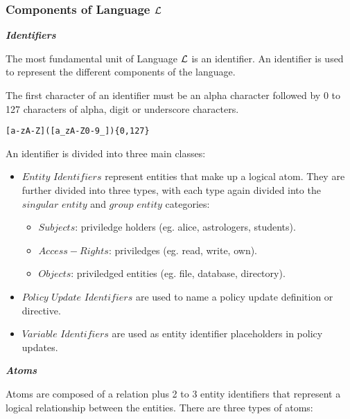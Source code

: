 \documentclass[10pt, twocolumn]{article}
\begin{document}
      \subsubsection{Components of Language $\cal{L}$}

        \noindent \textbf{\emph{Identifiers}}

          The most fundamental unit of Language $\cal{L}$ is an identifier. An
          identifier is used to represent the different components of the
          language. 
    
          The first character of an identifier must be an alpha character
          followed by 0 to 127 characters of alpha, digit or underscore
          characters.

          \begin{verbatim}[a-zA-Z]([a_zA-Z0-9_]){0,127}\end{verbatim}

          An identifier is divided into three main classes:

          \begin{itemize}
            \item
              $Entity$ $Identifiers$ represent entities that make up a logical
              atom. They are further divided into three types, with each type
              again divided into the $singular$ $entity$ and $group$ $entity$
              categories:
              \begin{itemize}
                \item
                  $Subjects$: priviledge holders (eg. alice, astrologers,
                  students).
                \item
                  $Access-Rights$: priviledges (eg. read, write, own).
                \item
                  $Objects$: priviledged entities (eg. file, database,
                  directory).
              \end{itemize}
            \item
              $Policy$ $Update$ $Identifiers$ are used to name a policy
              update definition or directive.
            \item
              $Variable$ $Identifiers$ are used as entity identifier
              placeholders in policy updates.
          \end{itemize}

        \noindent \textbf{\emph{Atoms}}
 
          Atoms are composed of a relation plus 2 to 3 entity identifiers
          that represent a logical relationship between the entities. There are
          three types of atoms:
\end{document}
